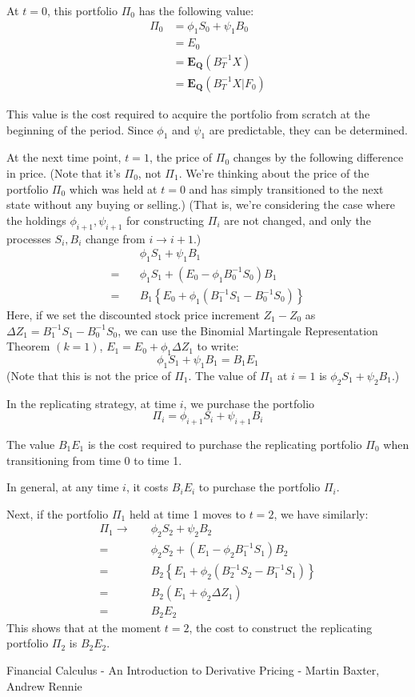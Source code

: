 \documentclass[uplatex,a4j,12pt,dvipdfmx]{jsarticle}
\begin{document}
At $t=0$, this portfolio $\Pi_{0}$ has the following value:\[\begin{split} \Pi_{0} &= \phi_{1} S_{0} + \psi_{1} B_{0} \\ &= E_{0} \\ &= \mathbf{E_{Q}}(B_{T}^{-1} X) \\ &= \mathbf{E_{Q}}(B_{T}^{-1} X | F_{0}) \end{split}\]

This value is the cost required to acquire the portfolio from scratch at the beginning of the period. Since $\phi_{1}$ and $\psi_{1}$ are predictable, they can be determined.

At the next time point, $t=1$, the price of $\Pi_{0}$ changes by the following difference in price. (Note that it's $\Pi_{0}$, not $\Pi_{1}$. We're thinking about the price of the portfolio $\Pi_{0}$ which was held at $t=0$ and has simply transitioned to the next state without any buying or selling.) (That is, we're considering the case where the holdings $\phi_{i+1},\psi_{i+1}$ for constructing $\Pi_{i}$ are not changed, and only the processes $S_{i},B_{i}$ change from $i \to i+1$.)
\[\begin{split} & \quad \phi_{1} S_{1} + \psi_{1} B_{1} \\ =& \quad \phi_{1} S_{1} + \left( E_{0} - \phi_{1} B_{0}^{-1} S_{0} \right) B_{1} \\ =& \quad B_{1} \left\{ E_{0} + \phi_{1} ( B_{1}^{-1} S_{1} - B_{0}^{-1} S_{0} ) \right\} \end{split}\]
Here, if we set the discounted stock price increment $Z_{1} - Z_{0}$ as $\Delta Z_{1} = B_{1}^{-1} S_{1} - B_{0}^{-1} S_{0}$, we can use the Binomial Martingale Representation Theorem $(k=1)$, $E_{1} = E_{0} + \phi_{1} \Delta Z_{1}$ to write:\[\phi_{1} S_{1} + \psi_{1} B_{1} = B_{1} E_{1}\] (Note that this is not the price of $\Pi_{1}$. The value of $\Pi_{1}$ at $i=1$ is $\phi_{2} S_{1} + \psi_{2} B_{1}$.)

In the replicating strategy, at time $i$, we purchase the portfolio\[\Pi_{i} = \phi_{i+1} S_{i} + \psi_{i+1} B_{i}\]

The value $B_{1} E_{1}$ is the cost required to purchase the replicating portfolio $\Pi_{0}$ when transitioning from time 0 to time 1.

In general, at any time $i$, it costs $B_{i} E_{i}$ to purchase the portfolio $\Pi_{i}$.

Next, if the portfolio $\Pi_{1}$ held at time 1 moves to $t=2$, we have similarly:\[\begin{split} \Pi_{1} \to& \quad \phi_{2} S_{2} + \psi_{2} B_{2} \\ =& \quad \phi_{2} S_{2} + \left( E_{1} - \phi_{2} B_{1}^{-1} S_{1} \right) B_{2} \\ =& \quad B_{2} \left\{ E_{1} + \phi_{2} ( B_{2}^{-1} S_{2} - B_{1}^{-1} S_{1} ) \right\} \\ =& \quad B_{2} \left( E_{1} + \phi_{2} \Delta Z_{1} \right) \\ =& \quad B_{2} E_{2} \end{split}\]
This shows that at the moment $t=2$, the cost to construct the replicating portfolio $\Pi_{2}$ is $B_{2} E_{2}$.

\begin{thebibliography}{9}
	Financial Calculus - An Introduction to Derivative Pricing - Martin Baxter, Andrew Rennie
\end{thebibliography}
\end{document}
